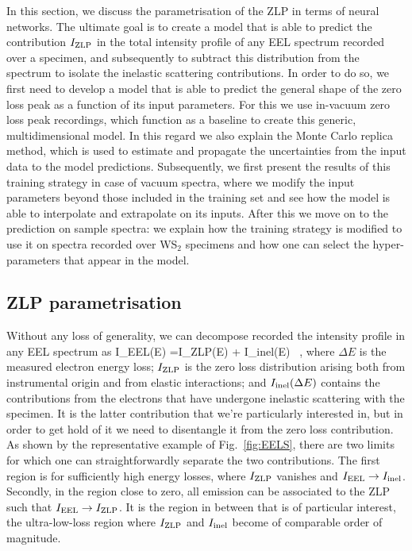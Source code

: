 In this section, we discuss the parametrisation of the ZLP in terms of neural networks.
%
The ultimate goal is to create a model that is able to predict the contribution $I_{\rm ZLP}$
in the total intensity profile of any EEL spectrum recorded over a specimen, 
and subsequently to subtract this distribution from the spectrum to isolate the inelastic
scattering contributions.
%
In order to do so, we first need to develop a model that is able to predict the general
shape of the zero loss peak as a function of its input parameters. 
%
For this we use in-vacuum zero loss peak recordings, which function as a baseline to 
create this generic, multidimensional model.
%
In this regard we also
explain the Monte Carlo replica method, which is used to estimate and propagate the
uncertainties from the input data to the model predictions.
%
Subsequently, we first present the results of this training strategy in case of 
vacuum spectra, where we modify the input parameters beyond those included in the training set
and see how the model is able to interpolate and extrapolate on its inputs.
%
After this we move on to the prediction on sample spectra: 
we explain how the training strategy is modified to use it on spectra recorded over
WS$_2$ specimens and how one can select the hyper-parameters that appear in the model.

\subsection{ZLP parametrisation}
\label{sec:parametrisation}

Without any loss of generality, we can decompose recorded the intensity profile
in any EEL spectrum as
\be
\label{eq:IeelTot}
I_{\rm EEL}(\Delta E) =I_{\rm ZLP}(\Delta E) + I_{\rm inel}(\Delta E) \, ,
\ee
where $\Delta E$ is the measured electron energy loss; $I_{\rm ZLP}$ is the zero loss
distribution arising both from instrumental origin and from elastic interactions; and
$I_{\rm inel}(\Delta E)$ contains the contributions from the electrons that have undergone
inelastic scattering with the specimen. 
%
It is the latter contribution that we're particularly interested in, but in order 
to get hold of it we need to disentangle it from the zero loss contribution.
%
As shown by the representative example of Fig.~\ref{fig:EELS}, there are two limits
for which one can straightforwardly separate the two contributions.
%
The first region is for sufficiently high energy losses, where
$I_{\rm ZLP}$ vanishes and $I_{\rm EEL} \to I_{\rm inel}$.
%
Secondly, in the region close to zero, all emission can be associated to
the ZLP such that $I_{\rm EEL}\to  I_{\rm ZLP}$.
%
It is the region in between that is of particular interest, 
the ultra-low-loss region where $I_{\rm ZLP}$ and $I_{\rm inel}$
become of comparable order of magnitude.

